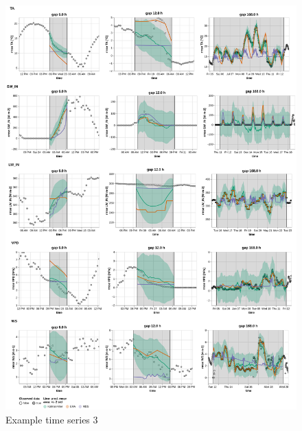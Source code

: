 \documentclass{article}
\newcommand{\imgwidth}{6in}
\begin{document}
\begin{figure}
\centerline{\includegraphics[width=\imgwidth]{images2/timeseries_1_2}}
\caption{Example time series 3}
\label{fig:ts_3-1}
\end{figure}
\end{document}
